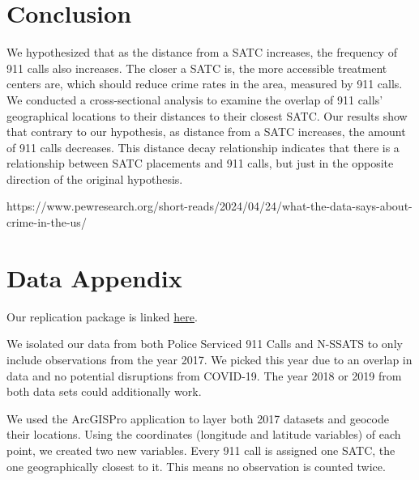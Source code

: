 \documentclass[12pt]{article}
\begin{document}
\section{Conclusion}
\label{sec:conclusion}

    We hypothesized that as the distance from a SATC increases, the frequency of 911 calls also increases. The closer a SATC is, the more accessible treatment centers are, which should reduce crime rates in the area, measured by 911 calls. We conducted a cross-sectional analysis to examine the overlap of 911 calls' geographical locations to their distances to their closest SATC. Our results show that contrary to our hypothesis, as distance from a SATC increases, the amount of 911 calls decreases. This distance decay relationship indicates that there is a relationship between SATC placements and 911 calls, but just in the opposite direction of the original hypothesis. 


 

\newpage
\singlespacing
\setlength\bibsep{0pt}



https://www.pewresearch.org/short-reads/2024/04/24/what-the-data-says-about-crime-in-the-us/

\newpage
\section*{Data Appendix} \label{sec:appendixa}

Our replication package is linked \href{https://github.com/ecn310/course-project-zipcentercrime/tree/main/Reproducibility%20Package}{here}.

We isolated our data from both Police Serviced 911 Calls and N-SSATS to only include observations from the year 2017. We picked this year due to an overlap in data and no potential disruptions from COVID-19. The year 2018 or 2019 from both data sets could additionally work. 

We used the ArcGISPro application to layer both 2017 datasets and geocode their locations. Using the coordinates (longitude and latitude variables) of each point, we created two new variables. Every 911 call is assigned one SATC, the one geographically closest to it. This means no observation is counted twice. 
\end{document}
